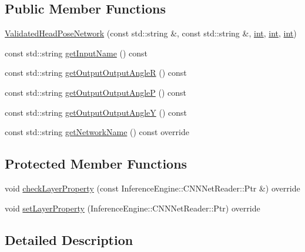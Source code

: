 \subsection*{Public Member Functions}
\begin{DoxyCompactItemize}
\item 
\hyperlink{classValidatedHeadPoseNetwork_ab1f5ab40916a5dadd4d0b9271b643228}{Validated\+Head\+Pose\+Network} (const std\+::string \&, const std\+::string \&, \hyperlink{CMakeCache_8txt_a79a3d8790b2588b09777910863574e09}{int}, \hyperlink{CMakeCache_8txt_a79a3d8790b2588b09777910863574e09}{int}, \hyperlink{CMakeCache_8txt_a79a3d8790b2588b09777910863574e09}{int})
\item 
const std\+::string \hyperlink{classValidatedHeadPoseNetwork_a433f0b95102495fc64982eab14e7c983}{get\+Input\+Name} () const 
\item 
const std\+::string \hyperlink{classValidatedHeadPoseNetwork_a63597882861d4a89e7c71536f58146fc}{get\+Output\+Output\+AngleR} () const 
\item 
const std\+::string \hyperlink{classValidatedHeadPoseNetwork_a4597b163ef1723c5cf26e1146cd8788f}{get\+Output\+Output\+AngleP} () const 
\item 
const std\+::string \hyperlink{classValidatedHeadPoseNetwork_a673a9ddc93b31a5763d41a8751fbe4c5}{get\+Output\+Output\+AngleY} () const 
\item 
const std\+::string \hyperlink{classValidatedHeadPoseNetwork_ac711ff3689e858fc089919a185d6eab8}{get\+Network\+Name} () const override
\end{DoxyCompactItemize}
\subsection*{Protected Member Functions}
\begin{DoxyCompactItemize}
\item 
void \hyperlink{classValidatedHeadPoseNetwork_a29656482a9102a936766f6bedd8d2967}{check\+Layer\+Property} (const Inference\+Engine\+::\+C\+N\+N\+Net\+Reader\+::\+Ptr \&) override
\item 
void \hyperlink{classValidatedHeadPoseNetwork_a35f7c37270398f1ac06d342a73b29f62}{set\+Layer\+Property} (Inference\+Engine\+::\+C\+N\+N\+Net\+Reader\+::\+Ptr) override
\end{DoxyCompactItemize}


\subsection{Detailed Description}


